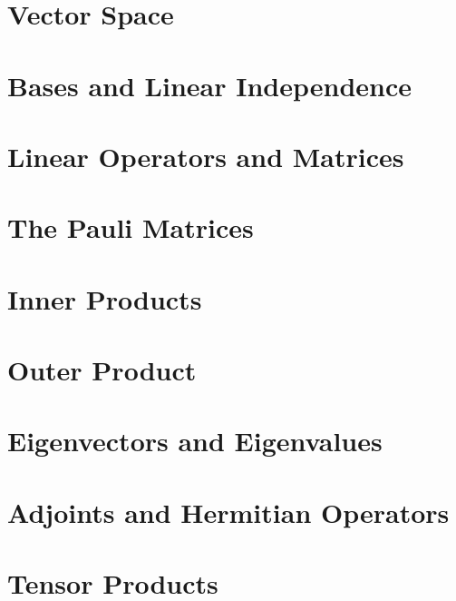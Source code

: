 \documentclass[
	11pt, %
	a4paper, %
]{LegrandOrangeBook}
\begin{document}
    \section{Vector Space} 
    

    \section{Bases and Linear Independence} 
    

    \section{Linear Operators and Matrices} 
    

    \section{The Pauli Matrices} 
    

    \section{Inner Products} 
    

    \section{Outer Product} 
    

    \section{Eigenvectors and Eigenvalues} 
    

    \section{Adjoints and Hermitian Operators} 
    

    \section{Tensor Products} 
    
\end{document}
